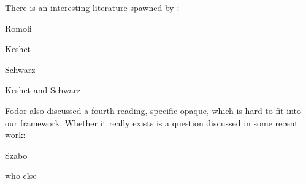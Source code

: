 {\setlength{\parindent}{0pt}\setlength{\parskip}{6pt}

There is an interesting literature spawned by \cite{percus-2000-constraints}:
  
\begin{bibentrylist}
\item Romoli
\item Keshet
\item Schwarz
\item Keshet and Schwarz
\end{bibentrylist}

Fodor also discussed a fourth reading, specific opaque, which is hard to fit
into our framework. Whether it really exists is a question discussed in some
recent work:

\begin{bibentrylist}
\item Szabo
\item who else
\end{bibentrylist}

}

